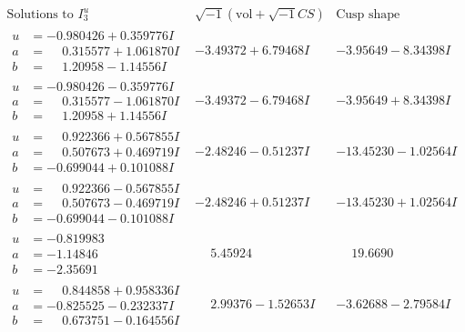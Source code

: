 \documentclass[1p]{elsarticle_modified}
\theoremstyle{definition}
\newcommand{\I}{\sqrt{-1}}
\begin{document}
$$\begin{array}{c|c|c}  
\text{Solutions to }I^u_{3}& \I (\text{vol} + \sqrt{-1}CS) & \text{Cusp shape}\\
 \hline 
\begin{aligned}
u &= -0.980426 + 0.359776 I \\
a &= \phantom{-}0.315577 + 1.061870 I \\
b &= \phantom{-}1.20958 - 1.14556 I\end{aligned}
 & -3.49372 + 6.79468 I & -3.95649 - 8.34398 I \\ \hline\begin{aligned}
u &= -0.980426 - 0.359776 I \\
a &= \phantom{-}0.315577 - 1.061870 I \\
b &= \phantom{-}1.20958 + 1.14556 I\end{aligned}
 & -3.49372 - 6.79468 I & -3.95649 + 8.34398 I \\ \hline\begin{aligned}
u &= \phantom{-}0.922366 + 0.567855 I \\
a &= \phantom{-}0.507673 + 0.469719 I \\
b &= -0.699044 + 0.101088 I\end{aligned}
 & -2.48246 - 0.51237 I & -13.45230 - 1.02564 I \\ \hline\begin{aligned}
u &= \phantom{-}0.922366 - 0.567855 I \\
a &= \phantom{-}0.507673 - 0.469719 I \\
b &= -0.699044 - 0.101088 I\end{aligned}
 & -2.48246 + 0.51237 I & -13.45230 + 1.02564 I \\ \hline\begin{aligned}
u &= -0.819983\phantom{ +0.000000I} \\
a &= -1.14846\phantom{ +0.000000I} \\
b &= -2.35691\phantom{ +0.000000I}\end{aligned}
 & \phantom{-}5.45924\phantom{ +0.000000I} & \phantom{-}19.6690\phantom{ +0.000000I} \\ \hline\begin{aligned}
u &= \phantom{-}0.844858 + 0.958336 I \\
a &= -0.825525 - 0.232337 I \\
b &= \phantom{-}0.673751 - 0.164556 I\end{aligned}
 & \phantom{-}2.99376 - 1.52653 I & -3.62688 - 2.79584 I \\ \hline\begin{aligned}

\end{aligned}
\end{array}$$
\end{document}
